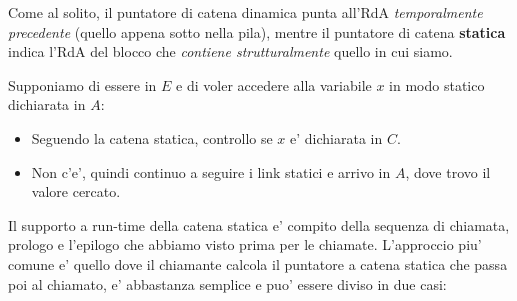 Come al solito, il puntatore di catena dinamica punta all'RdA \textit{temporalmente precedente} (quello appena sotto nella pila), mentre il puntatore di catena \textbf{statica} indica l'RdA del blocco che \textit{contiene strutturalmente} quello in cui siamo.


Supponiamo di essere in $ E $ e di voler accedere alla variabile $ x $ in modo statico dichiarata in $ A $:
\begin{itemize}
\item Seguendo la catena statica, controllo se $ x $ e' dichiarata in $ C $.
\item Non c'e', quindi continuo a seguire i link statici e arrivo in $ A $, dove trovo il valore cercato.
\end{itemize}

Il supporto a run-time della catena statica e' compito della sequenza di chiamata, prologo e l'epilogo che abbiamo visto prima per le chiamate. L'approccio piu' comune e' quello dove il chiamante calcola il puntatore a catena statica che passa poi al chiamato, e' abbastanza semplice e puo' essere diviso in due casi:

